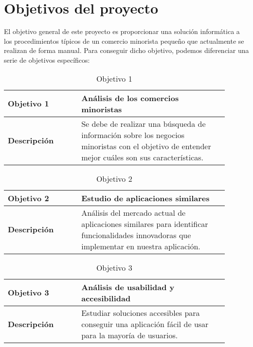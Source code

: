 \section{Objetivos del proyecto}
\label{sec:project_objectives}

El objetivo general de este proyecto es proporcionar una solución informática a los procedimientos típicos de un comercio minorista pequeño que actualmente se realizan de forma manual. Para conseguir dicho objetivo, podemos diferenciar una serie de objetivos específicos: 




\begin{table}[htb!]
	\centering %
	\begin{tabular}{|p{0.3\linewidth}|p{0.6\linewidth}|}
		\hline
		\rowcolor{grayshade} \textbf{Objetivo 1} & \textbf{Análisis de los comercios minoristas} \\
		\hline
		\textbf{Descripción} & Se debe de realizar una búsqueda de información sobre los negocios minoristas con el objetivo de entender mejor cuáles son sus características. \\
		\hline
	\end{tabular}
	\caption{Objetivo 1}
\end{table}

\begin{table}[htb!]
	\centering %
	\begin{tabular}{|p{0.3\linewidth}|p{0.6\linewidth}|}
		\hline %
		\rowcolor{grayshade} 
		\textbf{Objetivo 2} & \textbf{Estudio de aplicaciones similares} \\
		\hline 
		\textbf{Descripción} & Análisis del mercado actual de aplicaciones similares para identificar funcionalidades innovadoras que implementar en nuestra aplicación. \\
		\hline
	\end{tabular}
	\caption{Objetivo 2}
\end{table}

\begin{table}[htb!]
	\centering %
	\begin{tabular}{|p{0.3\linewidth}|p{0.6\linewidth}|}
		\hline %
		\rowcolor{grayshade} 
		\textbf{Objetivo 3} & \textbf{Análisis de usabilidad y accesibilidad} \\
		\hline 
		\textbf{Descripción} & Estudiar soluciones accesibles para conseguir una aplicación fácil de usar para la mayoría de usuarios. \\
		\hline
	\end{tabular}
	\caption{Objetivo 3}
\end{table}


